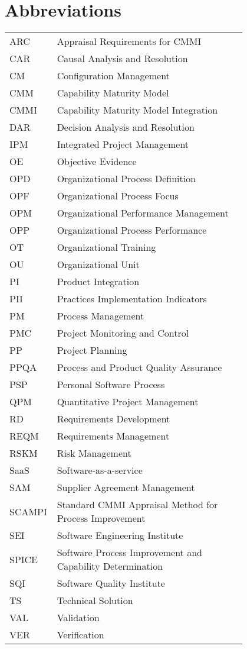 \chapter*{Abbreviations}

\begin{flushleft}
	\begin{tabular}{l p{0.8\linewidth}}
		ARC & Appraisal Requirements for CMMI\\
		CAR & Causal Analysis and Resolution\\
		CM & Configuration Management\\
		CMM & Capability Maturity Model\\
		CMMI & Capability Maturity Model Integration\\
		DAR & Decision Analysis and Resolution\\
		IPM & Integrated Project Management\\
		OE & Objective Evidence\\
		OPD & Organizational Process Definition\\
		OPF & Organizational Process Focus\\
		OPM & Organizational Performance Management\\
		OPP & Organizational Process Performance\\
		OT & Organizational Training\\
		OU & Organizational Unit\\
		PI & Product Integration\\
		PII & Practices Implementation Indicators\\
		PM & Process Management\\
		PMC & Project Monitoring and Control\\
		PP & Project Planning\\
		PPQA & Process and Product Quality Assurance\\
		PSP & Personal Software Process\\
		QPM & Quantitative Project Management\\
		RD & Requirements Development\\
		REQM & Requirements Management\\
		RSKM & Risk Management\\
		SaaS & Software-as-a-service\\
		SAM & Supplier Agreement Management\\
		SCAMPI & Standard CMMI Appraisal Method for Process Improvement\\
		SEI & Software Engineering Institute\\
		SPICE & Software Process Improvement and Capability Determination\\
		SQI & Software Quality Institute\\
		TS & Technical Solution\\
		VAL & Validation\\
		VER & Verification\\
	\end{tabular}
\end{flushleft}